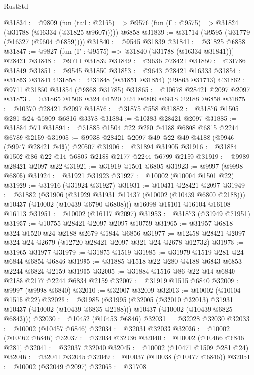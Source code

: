 \begin{lexlean}{RustStd}
\begin{coremodule}
@31834 := @9809
    (fun (tail : @2165) => @9576 (fun (Γ : @9575) => @31824 (@31788 (@16334 (@31825 @9607)))))
    @6858
@31839 := @31714 (@9595 (@31779 (@16327 (@9604 @6859))))
@31840 := @9545 @31839
@31841 := @31825 @6858
@31847 := @9827 (fun (Γ : @9575) => @31840 (@31788 (@16334 @31841))) @28421
@31848 := @9711 @31839
@31849 := @9636 @28421
@31850 := @31786 @31849
@31851 := @9545 @31850
@31853 := @9643 @28421 @16333
@31854 := @31853 @31841
@31858 := @31848 (@31851 @31854) (@9863 @31713)
@31862 := @9711 @31850 @31854 (@9868 @31785)
@31865 := @10678 @28421 @2097 @2097
@31873 := @31865 @1506 @324 @1520 @24 @6809 @6818 @2188 @6858
@31875 := @10370 @28421 @2097
@31876 := @31875 @558
@31882 := @31876 @1505 @281 @24 @6809 @6816 @3378
@31884 := @10383 @28421 @2097
@31885 := @31884 @71
@31894 := @31885 @1504 @22 @280 @4188 @6808 @6815 @2244 @6789 @2159
@31905 := @9938 @28421 @2097 @49 @22 @49 @4188 (@9946 (@9947 @28421 @49)) @20507
@31906 := @31894 @31905
@31916 := @31884 @1502 @86 @22 @14 @6805 @2188 @2177 @2244 @6799 @2159
@31919 := @9989 @28421 @2097 @22
@31921 := @31919 @1501 @6805
@31923 := @9997 (@9998 @6805)
@31924 := @31921 @31923
@31927 := @10002 (@10004 @1501 @22)
@31929 := @31916 (@31924 @31927)
@31931 := @10431 @28421 @2097
@31949 := @31882
    (@31906
      (@31929 @31931 @10437 (@10002 (@10439 @6800 @2188)))
      @10437
      (@10002 (@10439 @6790 @6808)))
    @16098
    @16101
    @16104
    @16108
    @16113
@31951 := @10002 (@16117 @2097)
@31953 := @31873 (@31949 @31951)
@31957 := @10755 @28421 @2097 @2097 @10759
@31965 := @31957 @6818 @324 @1520 @24 @2188 @2679 @6844 @6856
@31977 := @12458 @28421 @2097 @324 @24 @2679 (@12720 @28421 @2097 @321 @24 @2678 @12732)
@31978 := @31965 @31977
@31979 := @31875 @1509
@31985 := @31979 @1519 @281 @24 @6844 @6854 @6846
@31995 := @31885 @1518 @22 @280 @4188 @6843 @6853 @2244 @6824 @2159 @31905
@32005 := @31884 @1516 @86 @22 @14 @6840 @2188 @2177 @2244 @6834 @2159
@32007 := @31919 @1515 @6840
@32009 := @9997 (@9998 @6840)
@32010 := @32007 @32009
@32013 := @10002 (@10004 @1515 @22)
@32028 := @31985
    (@31995
      (@32005 (@32010 @32013) @31931 @10437 (@10002 (@10439 @6835 @2188)))
      @10437
      (@10002 (@10439 @6825 @6843)))
@32030 := @10452 (@10453 @6846)
@32031 := @32028 @32030
@32033 := @10002 (@10457 @6846)
@32034 := @32031 @32033
@32036 := @10002 (@10462 @6846)
@32037 := @32034 @32036
@32040 := @10002 (@10466 @6846 @281)
@32041 := @32037 @32040
@32045 := @10002 (@10471 @1509 @281 @24)
@32046 := @32041 @32045
@32049 := @10037 (@10038 (@10477 @6846))
@32051 := @10002 (@32049 @2097)
@32065 := @31708

\end{coremodule}
\end{lexlean}
